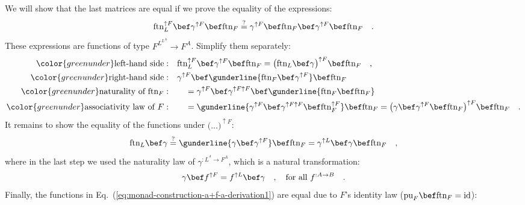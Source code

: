 We will show that the last matrices are equal if we prove the equality
of the expressions:
\[
\text{ftn}_{L}^{\uparrow F}\bef\gamma^{\uparrow F}\bef\text{ftn}_{F}\overset{?}{=}\gamma^{\uparrow F}\bef\text{ftn}_{F}\bef\gamma^{\uparrow F}\bef\text{ftn}_{F}\quad.
\]
These expressions are functions of type $F^{L^{L^{A}}}\rightarrow F^{A}$.
Simplify them separately:
\begin{align*}
{\color{greenunder}\text{left-hand side}:}\quad & \text{ftn}_{L}^{\uparrow F}\bef\gamma^{\uparrow F}\bef\text{ftn}_{F}=\big(\text{ftn}_{L}\bef\gamma\big)^{\uparrow F}\bef\text{ftn}_{F}\quad,\\
{\color{greenunder}\text{right-hand side}:}\quad & \gamma^{\uparrow F}\bef\gunderline{\text{ftn}_{F}\bef\gamma^{\uparrow F}}\bef\text{ftn}_{F}\\
{\color{greenunder}\text{naturality of }\text{ftn}_{F}:}\quad & \quad=\gamma^{\uparrow F}\bef\gamma^{\uparrow F\uparrow F}\bef\gunderline{\text{ftn}_{F}\bef\text{ftn}_{F}}\\
{\color{greenunder}\text{associativity law of }F:}\quad & \quad=\gunderline{\gamma^{\uparrow F}\bef\gamma^{\uparrow F\uparrow F}\bef\text{ftn}_{F}^{\uparrow F}}\bef\text{ftn}_{F}=\big(\gamma\bef\gamma^{\uparrow F}\bef\text{ftn}_{F}\big)^{\uparrow F}\bef\text{ftn}_{F}\quad.
\end{align*}
It remains to show the equality of the functions under $\big(...\big)^{\uparrow F}$:
\begin{equation}
\text{ftn}_{L}\bef\gamma\overset{?}{=}\gunderline{\gamma\bef\gamma^{\uparrow F}}\bef\text{ftn}_{F}=\gamma^{\uparrow L}\bef\gamma\bef\text{ftn}_{F}\quad,\label{eq:monad-construction-a+f-a-derivation1}
\end{equation}
where in the last step we used the naturality law of $\gamma^{:L^{^{A}}\rightarrow F^{A}}$,
which is a natural transformation:
\[
\gamma\bef f^{\uparrow F}=f^{\uparrow L}\bef\gamma\quad,\quad\text{for all }f^{:A\rightarrow B}\quad.
\]
Finally, the functions in Eq.~(\ref{eq:monad-construction-a+f-a-derivation1})
are equal due to $F$\textsf{'}s identity law ($\text{pu}_{F}\bef\text{ftn}_{F}=\text{id}$):
